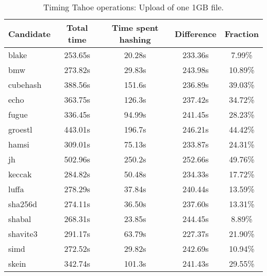\begin{table}[h]
  \centering
  \begin{tabular}{ | l | c | c | c | c | }
    \hline
    Candidate & Total time & Time spent hashing & Difference & Fraction \\ \hline
    blake & 253.65s & 20.28s & 233.36s & 7.99\% \\ \hline
    bmw & 273.82s & 29.83s & 243.98s & 10.89\% \\ \hline
    cubehash & 388.56s & 151.6s & 236.89s & 39.03\% \\ \hline
    echo & 363.75s & 126.3s & 237.42s & 34.72\% \\ \hline
    fugue & 336.45s & 94.99s & 241.45s & 28.23\% \\ \hline
    groestl & 443.01s & 196.7s & 246.21s & 44.42\% \\ \hline
    hamsi & 309.01s & 75.13s & 233.87s & 24.31\% \\ \hline
    jh & 502.96s & 250.2s & 252.66s & 49.76\% \\ \hline
    keccak & 284.82s & 50.48s & 234.33s & 17.72\% \\ \hline
    luffa & 278.29s & 37.84s & 240.44s & 13.59\% \\ \hline
    sha256d & 274.11s & 36.50s & 237.60s & 13.31\% \\ \hline
    shabal & 268.31s & 23.85s & 244.45s & 8.89\% \\ \hline
    shavite3 & 291.17s & 63.79s & 227.37s & 21.90\% \\ \hline
    simd & 272.52s & 29.82s & 242.69s & 10.94\% \\ \hline
    skein & 342.74s & 101.3s & 241.43s & 29.55\% \\ \hline
  \end{tabular}
  \caption{Timing Tahoe operations: Upload of one 1GB file.}
  \label{tbl:hashingtimes:put1gb}
\end{table}


